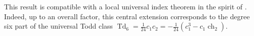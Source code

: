\documentclass[11pt]{amsart}
\theoremstyle{definition}
\theoremstyle{remark}
\numberwithin{equation}{section}
\newcommand{\op}{\operatorname}
\begin{document}
\begin{rmk}
  This result is compatible with a local universal index theorem in the spirit of \cite{BDmumford}.
  Indeed, up to an overall factor, this central extension corresponds to the degree six part of the universal Todd class
  $\op{Td}_6 = \frac{1}{24} c_1 c_2 = - \frac{1}{24} (c_1^3 - c_1 \op{ch}_2)$.
\end{rmk}
\begin{figure}[htbp]
    \centering



\begin{tikzpicture}[x=0.75pt,y=0.75pt,yscale=-1,xscale=1]


\end{tikzpicture}
\end{figure}
\end{document}
